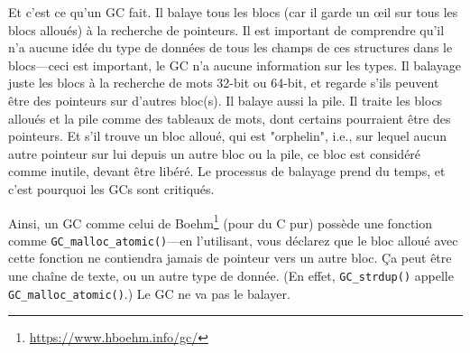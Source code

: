 Et c'est ce qu'un \ac{GC} fait.
Il balaye tous les blocs (car il garde un \oe{}il sur tous les blocs alloués) à
la recherche de pointeurs.
Il est important de comprendre qu'il n'a aucune idée du type de données de tous les
champs de ces structures dans le blocs---ceci est important, le \ac{GC} n'a aucune information
sur les types.
Il balayage juste les blocs à la recherche de mots 32-bit ou 64-bit, et regarde s'ils
peuvent être des pointeurs sur d'autres bloc(s).
Il balaye aussi la pile.
Il traite les blocs alloués et la pile comme des tableaux de mots, dont certains pourraient
être des pointeurs.
Et s'il trouve un bloc alloué, qui est "orphelin", i.e., sur lequel aucun autre pointeur
sur lui depuis un autre bloc ou la pile, ce bloc est considéré comme inutile, devant
être libéré.
Le processus de balayage prend du temps, et c'est pourquoi les \ac{GC}s sont critiqués.

Ainsi, un \ac{GC} comme celui de Boehm\footnote{\url{https://www.hboehm.info/gc/}}
(pour du C pur) possède une fonction comme \verb|GC_malloc_atomic()|---en l'utilisant,
vous  déclarez que le bloc alloué avec cette fonction ne contiendra jamais de pointeur
vers un autre bloc.
Ça peut être une chaîne de texte, ou un autre type de donnée.
(En effet, \verb|GC_strdup()| appelle \verb|GC_malloc_atomic()|.)
Le \ac{GC} ne va pas le balayer.

